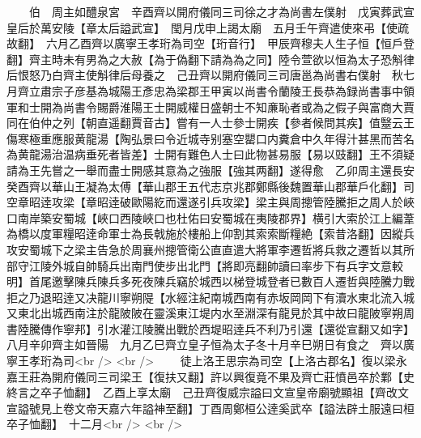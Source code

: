 　　伯　周主如醴泉宮　辛酉齊以開府儀同三司徐之才為尚書左僕射　戊寅葬武宣皇后於萬安陵【章太后謚武宣】　閠月戊申上謁太廟　五月壬午齊遣使來弔【使疏故翻】　六月乙酉齊以廣寧王孝珩為司空【珩音行】　甲辰齊穆夫人生子恒【恒戶登翻】齊主時未有男為之大赦【為于偽翻下請為為之同】陸令萱欲以恒為太子恐斛律后恨怒乃白齊主使斛律后母養之　己丑齊以開府儀同三司唐邕為尚書右僕射　秋七月齊立肅宗子彦基為城陽王彥忠為梁郡王甲寅以尚書令蘭陵王長恭為録尚書事中領軍和士開為尚書令賜爵淮陽王士開威權日盛朝士不知亷恥者或為之假子與富商大賈同在伯仲之列【朝直遥翻賈音古】嘗有一人士參士開疾【參者候問其疾】值毉云王傷寒極重應服黄龍湯【陶弘景曰令近城寺别塞空罌口内糞倉中久年得汁甚黑而苦名為黄龍湯治温病垂死者皆差】士開有難色人士曰此物甚易服【易以豉翻】王不須疑請為王先嘗之一舉而盡士開感其意為之強服【強其两翻】遂得愈　乙卯周主還長安　癸酉齊以華山王凝為太傅【華山郡王五代志京兆郡鄭縣後魏置華山郡華戶化翻】司空章昭逹攻梁【章昭逹破歐陽紇而還遂引兵攻梁】梁主與周摠管陸騰拒之周人於峽口南岸築安蜀城【峽口西陵峽口也杜佑曰安蜀城在夷陵郡界】横引大索於江上編葦為橋以度軍糧昭逹命軍士為長戟施於樓船上仰割其索索斷糧絶【索昔洛翻】因縱兵攻安蜀城下之梁主告急於周襄州摠管衛公直直遣大將軍李遷哲將兵救之遷哲以其所部守江陵外城自帥騎兵出南門使步出北門【將即亮翻帥讀曰率步下有兵字文意較明】首尾邀擊陳兵陳兵多死夜陳兵竊於城西以梯登城登者已數百人遷哲與陸騰力戰拒之乃退昭逹又决龍川寧朔隄【水經注紀南城西南有赤坂岡岡下有瀆水東北流入城又東北出城西南注於龍陂陂在靈溪東江堤内水至淵深有龍見於其中故曰龍陂寧朔周書陸騰傳作寧邦】引水灌江陵騰出戰於西堤昭逹兵不利乃引還【還從宣翻又如字】　八月辛卯齊主如晉陽　九月乙巳齊立皇子恒為太子冬十月辛巳朔日有食之　齊以廣寧王孝珩為司<br />
<br />
　　徒上洛王思宗為司空【上洛古郡名】復以梁永嘉王莊為開府儀同三司梁王【復扶又翻】許以興復竟不果及齊亡莊憤邑卒於鄴【史終言之卒子恤翻】　乙酉上享太廟　己丑齊復威宗謚曰文宣皇帝廟號顯祖【齊改文宣謚號見上卷文帝天嘉六年謚神至翻】丁酉周鄭桓公逹奚武卒【謚法辟土服遠曰桓卒子恤翻】　十二月<br />
<br />
